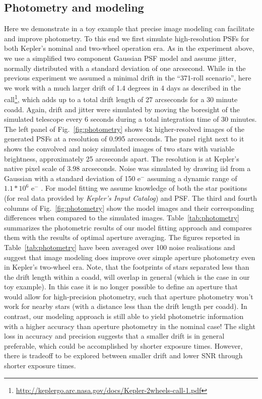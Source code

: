 \documentclass[letterpaper,12pt,whitepaper]{haastex}
\begin{document}
\subsection{Photometry and modeling}\label{sec:photometry}

Here we demonstrate in a toy example that precise image modeling can
facilitate and improve photometry. To this end we first simulate
high-resolution PSFs for both Kepler's nominal and two-wheel operation
era. As in the experiment above, we use a simplified two component
Gaussian PSF model and assume jitter, normally distributed with a
standard deviation of one arcsecond. While in the previous experiment
we assumed a minimal drift in the ``371-roll scenario'', here we work
with a much larger drift of 1.4 degrees in 4 days as described in the
call\footnote{\url{http://keplergo.arc.nasa.gov/docs/Kepler-2wheels-call-1.pdf}},
which adds up to a total drift length of 27 arcseconds for a 30 minute
coadd.  Again, drift and jitter were simulated by moving the boresight
of the simulated telescope every 6 seconds during a total integration
time of 30 minutes. The left panel of Fig.~\ref{fig:photometry} shows
4x higher-resolved images of the generated PSFs at a resolution of
0.995 arcseconds. The panel right next to it shows the convolved and
noisy simulated images of two stars with variable brightness,
approximately 25 arcseconds apart. The resolution is at Kepler's
native pixel scale of 3.98 arcseconds. Noise was simulated by drawing
iid from a Gaussian with a standard deviation of 150 e$^-$ assuming a
dynamic range of $1.1 * 10^6$ e$^{-}$ \cite{gilliland2011}. For model
fitting we assume knowledge of both the star positions (for real data
provided by \emph{Kepler's Input Catalog}) and PSF. The third and
fourth columns of Fig.~\ref{fig:photometry} show the model images and
their corresponding differences when compared to the simulated
images. Table~\ref{tab:photometry} summarizes the photometric results
of our model fitting approach and compares them with the results of
optimal aperture averaging. The figures reported in
Table~\ref{tab:photometry} have been averaged over 100 noise
realisations and suggest that image modeling does improve over simple
aperture photometry even in Kepler's two-wheel era. Note, that the
footprints of stars separated less than the drift length within a
coadd, will overlap in general (which is the case in our toy
example). In this case it is no longer possible to define an aperture
that would allow for high-precision photometry, such that aperture
photometry won't work for nearby stars (with a distance less than the
drift length per coadd). In contrast, our modeling approach is still
able to yield photometric information with a higher accuracy than
aperture photometry in the nominal case! The slight loss in accuracy
and precision suggests that a smaller drift is in general preferable,
which could be accomplished by shorter exposure times. However, there
is tradeoff to be explored between smaller drift and lower SNR through
shorter exposure times.
\end{document}
